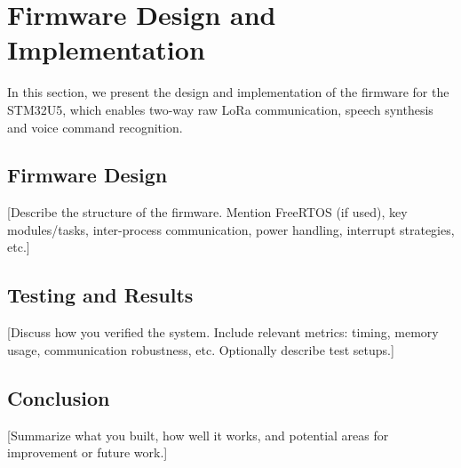 \section{Firmware Design and Implementation}

In this section, we present the design and implementation of the firmware for the STM32U5, which enables two-way raw LoRa communication, speech synthesis
and voice command recognition.



\subsection{Firmware Design}
[Describe the structure of the firmware. Mention FreeRTOS (if used), key modules/tasks, inter-process communication, power handling, interrupt strategies, etc.]

\subsection{Testing and Results}
[Discuss how you verified the system. Include relevant metrics: timing, memory usage, communication robustness, etc. Optionally describe test setups.]

\subsection{Conclusion}
[Summarize what you built, how well it works, and potential areas for improvement or future work.]
